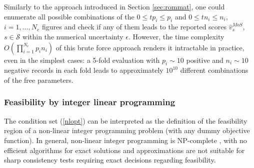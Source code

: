 \documentclass[3p, times]{elsarticle}
\begin{document}
Similarly to the approach introduced in Section \ref{sec:rommat}, one could enumerate all possible combinations of the $0 \leq tp_i \leq p_i$ and $0 \leq tn_i \leq n_i$, $i=1, \dots, N_e$ figures and check if any of them leads to the reported scores $\hat{v}_s^{MoS}$, $s\in\mathcal{S}$ within the numerical uncertainty $\epsilon$. However, the time complexity $O\left(\prod_{i=1}^{N_e}p_in_i\right)$ of this brute force approach renders it intractable in practice, even in the simplest cases: a 5-fold evaluation with $p_i\sim 10$ positive and $n_i\sim 10$ negative records in each fold leads to approximately $10^{10}$ different combinations of the free parameters. 

\subsubsection{Feasibility by integer linear programming}
\label{sec:moslinprog}

The condition set (\ref{nlopt}) can be interpreted as the definition of the feasibility region of a non-linear integer programming problem (with any dummy objective function). In general, non-linear integer programming is NP-complete \cite{ip}, with no efficient algorithms for exact solutions and approximations are not suitable for sharp consistency tests requiring exact decisions regarding feasibility. 
\end{document}
